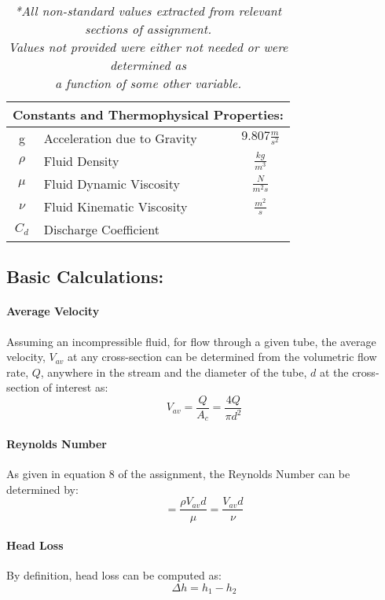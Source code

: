 \documentclass[12pt]{article}
\begin{document}
	\hfill\break\break
	\begin{table}
		\centering
		{
		\begin{tabular}{|c|l|c|}
		\hline
			\multicolumn{3}{|c|}{\textbf{Constants and Thermophysical Properties:}} \\
		\hline
		\hline
			g & Acceleration due to Gravity & $9.807\frac{m}{s^2}$\\
			$\rho$ & Fluid Density & $\frac{kg}{m^3}$\\
			$\mu$ & Fluid Dynamic Viscosity & $\frac{N}{m^2s}$\\
			$\nu$ & Fluid Kinematic Viscosity & $\frac{m^2}{s}$\\
			$C_d$ & Discharge Coefficient & ${}$\\
		\hline
		\end{tabular}
		}
		\caption*{\textit{*All non-standard values extracted from relevant sections of assignment. \\ Values not provided were either not needed or were determined as \\ a function of some other variable.}}
	\end{table}


	\subsection{Basic Calculations:}
	\paragraph{Average Velocity}
		Assuming an incompressible fluid, for flow through a given tube, the average velocity, $V_{av}$ at any cross-section can be determined from the volumetric flow rate, $Q$, anywhere in the stream and the diameter of the tube, $d$ at the cross-section of interest as:
		\begin{equation}
			V_{av} = \frac{Q}{A_{c}} = \frac{4Q}{\pi d^2}
		\end{equation}
		
	\paragraph{Reynolds Number}
	As given in equation 8 of the assignment, the Reynolds Number can be determined by:
	\begin{equation}
		[Re] = \frac{\rho V_{av}d}{\mu} = \frac{V_{av}d}{\nu}
	\end{equation}
	
	\paragraph{Head Loss}
	By definition, head loss can be computed as:
	\begin{equation}
 		\Delta h = h_1 - h_2
	\end{equation}
	
\end{document}
